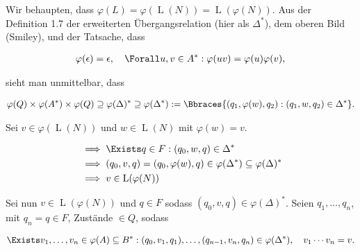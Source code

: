 \begin{solution}
\begin{center}
\end{center}

Wir behaupten, dass $\varphi(L) = \varphi(\operatorname L(N)) = \operatorname L(\varphi(N))$.
Aus der Definition 1.7 der erweiterten Übergangsrelation (hier als $\Delta^\ast$), dem oberen Bild (Smiley), und der Tatsache, dass

\begin{align*}
    \varphi(\epsilon) = \epsilon,
    \quad
    \Forall u, v \in A^\ast:
        \varphi(u v) = \varphi(u) \varphi(v),
\end{align*}

sieht man unmittelbar, dass

\begin{align*}
    \varphi(Q) \times \varphi(A^\ast) \times \varphi(Q)
    \supseteq
    \varphi(\Delta)^\ast
    \supseteq
    \varphi(\Delta^\ast)
    :=
    \Bbraces{(q_1, \varphi(w), q_2): (q_1, w, q_2) \in \Delta^\ast}.
\end{align*}

Sei $v \in \varphi(\operatorname L(N))$ und $w \in \operatorname L(N)$ mit $\varphi(w) = v$.

\begin{align*}
    & \implies
    \Exists q \in F: (q_0, w, q) \in \Delta^\ast \\
    & \implies
    (q_0, v, q) = (q_0, \varphi(w), q) \in \varphi(\Delta^\ast) \subseteq \varphi(\Delta)^\ast \\
    & \implies
    v \in \operatorname L(\varphi(N))
\end{align*}

Sei nun $v \in \operatorname L(\varphi(N))$ und $q \in F$ sodass $(q_0, v, q) \in \varphi(\Delta)^\ast$.
Seien $q_1, \dots, q_n$, mit $q_n = q \in F$, Zustände $\in Q$, sodass

\begin{align*}
    \Exists v_1, \dots, v_n \in \varphi(A) \subseteq B^\ast:
        (q_0, v_1, q_1), \dots, (q_{n-1}, v_n, q_n)
        \in
        \varphi(\Delta^\ast),
        \quad
        v_1 \cdots v_n = v.
\end{align*}


\end{solution}
